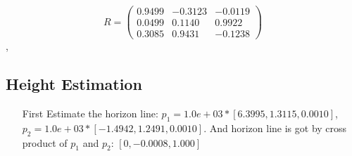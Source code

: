 \documentclass[11pt]{article}
\begin{document}
\[
R = \left( \begin{array}{ccc}
0.9499   & -0.3123   & -0.0119\\
0.0499   & 0.1140    & 0.9922 \\
0.3085   & 0.9431    & -0.1238
\end{array} \right)
\],

\subsection{Height Estimation}
\begin{itemize}
\item[First] Estimate the horizon line: $p_1 = 1.0e+03 * [6.3995, 1.3115, 0.0010]$, $p_2 = 1.0e+03 * [-1.4942, 1.2491, 0.0010]$. And horizon line is got by cross product of $p_1$ and $p_2$: $[0, -0.0008, 1.000]$
\end{itemize}



 
\end{document}

